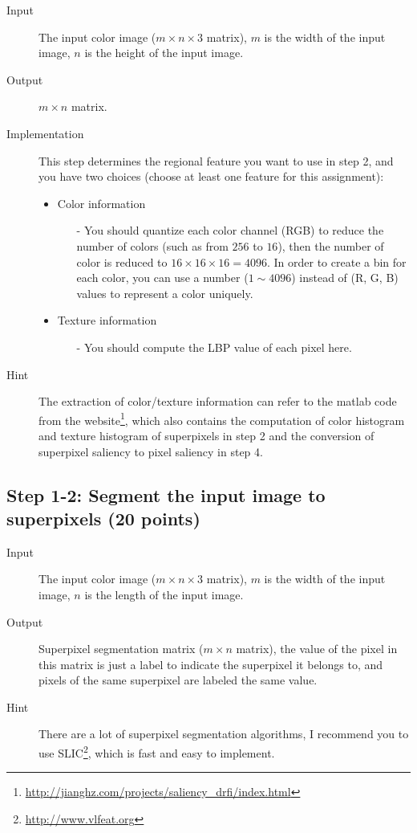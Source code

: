 \documentclass[12pt]{article}
\begin{document}
\begin{description}
\item[Input] The input color image ($m \times n \times 3$ matrix), $m$ is the width of the input image, $n$ is the height of the input image.
\item[Output] $m \times n$ matrix. 
\item[Implementation] This step determines the regional feature you want to use in step 2, and you have two choices (choose at least one feature for this assignment):
\begin{itemize}
\item Color information
\begin{itemize}
\item[-] You should quantize each color channel (RGB) to reduce the number of colors (such as from $256$ to $16$), then the number of color is reduced to $16 \times 16 \times 16 = 4096$. In order to create a bin for each color, you can use a number ($1 \sim 4096$) instead of (R, G, B) values to represent a color uniquely.
\end{itemize}
\item Texture information
\begin{itemize}
\item[-] You should compute the LBP value of each pixel here.  
\end{itemize}
\end{itemize}
\item[Hint] The extraction of color/texture information can refer to the matlab code from the website\footnote{\url{http://jianghz.com/projects/saliency_drfi/index.html}}, which also contains the computation of color histogram and texture histogram of superpixels in step 2 and the conversion of superpixel saliency to pixel saliency in step 4.
\end{description}

\subsection{Step 1-2: Segment the input image to superpixels (20 points)}

\begin{description}
\item[Input] The input color image ($m \times n \times 3$ matrix), $m$ is the width of the input image, $n$ is the length of the input image. 
\item[Output]  Superpixel segmentation matrix ($m \times n$ matrix), the value of the pixel in this matrix is just a label to indicate the superpixel it belongs to, and pixels of the same superpixel are labeled the same value. 
\item[Hint] There are a lot of superpixel segmentation algorithms, I recommend you to use SLIC\footnote{\url{http://www.vlfeat.org}}, which is fast and easy to implement.
\end{description}
\end{document}
